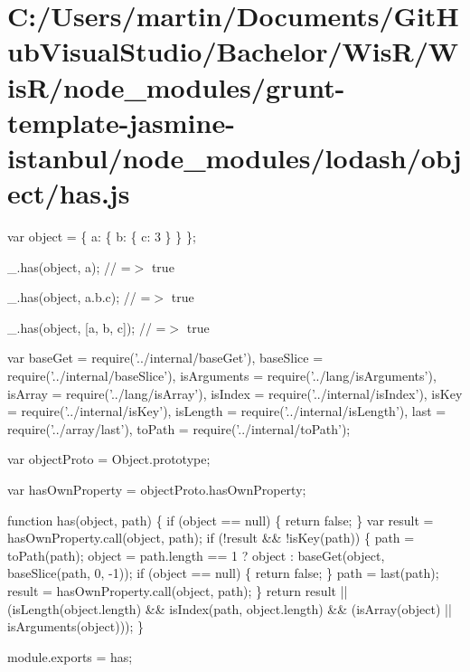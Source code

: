\hypertarget{_c_1_2_users_2martin_2_documents_2_git_hub_visual_studio_2_bachelor_2_wis_r_2_wis_r_2node_modulea712a55f8f1df407f18c03cb57735643}{}\section{C\+:/\+Users/martin/\+Documents/\+Git\+Hub\+Visual\+Studio/\+Bachelor/\+Wis\+R/\+Wis\+R/node\+\_\+modules/grunt-\/template-\/jasmine-\/istanbul/node\+\_\+modules/lodash/object/has.\+js}
var object = \{ \textquotesingle{}a\textquotesingle{}\+: \{ \textquotesingle{}b\textquotesingle{}\+: \{ \textquotesingle{}c\textquotesingle{}\+: 3 \} \} \};

\+\_\+.\+has(object, \textquotesingle{}a\textquotesingle{}); // =$>$ true

\+\_\+.\+has(object, \textquotesingle{}a.\+b.\+c\textquotesingle{}); // =$>$ true

\+\_\+.\+has(object, \mbox{[}\textquotesingle{}a\textquotesingle{}, \textquotesingle{}b\textquotesingle{}, \textquotesingle{}c\textquotesingle{}\mbox{]}); // =$>$ true


\begin{DoxyCodeInclude}
var baseGet = require(\textcolor{stringliteral}{'../internal/baseGet'}),
    baseSlice = require(\textcolor{stringliteral}{'../internal/baseSlice'}),
    isArguments = require(\textcolor{stringliteral}{'../lang/isArguments'}),
    isArray = require(\textcolor{stringliteral}{'../lang/isArray'}),
    isIndex = require(\textcolor{stringliteral}{'../internal/isIndex'}),
    isKey = require(\textcolor{stringliteral}{'../internal/isKey'}),
    isLength = require(\textcolor{stringliteral}{'../internal/isLength'}),
    last = require(\textcolor{stringliteral}{'../array/last'}),
    toPath = require(\textcolor{stringliteral}{'../internal/toPath'});

var objectProto = Object.prototype;

var hasOwnProperty = objectProto.hasOwnProperty;

\textcolor{keyword}{function} has(\textcolor{keywordtype}{object}, path) \{
  \textcolor{keywordflow}{if} (\textcolor{keywordtype}{object} == null) \{
    \textcolor{keywordflow}{return} \textcolor{keyword}{false};
  \}
  var result = hasOwnProperty.call(\textcolor{keywordtype}{object}, path);
  \textcolor{keywordflow}{if} (!result && !isKey(path)) \{
    path = toPath(path);
    \textcolor{keywordtype}{object} = path.length == 1 ? \textcolor{keywordtype}{object} : baseGet(\textcolor{keywordtype}{object}, baseSlice(path, 0, -1));
    \textcolor{keywordflow}{if} (\textcolor{keywordtype}{object} == null) \{
      \textcolor{keywordflow}{return} \textcolor{keyword}{false};
    \}
    path = last(path);
    result = hasOwnProperty.call(\textcolor{keywordtype}{object}, path);
  \}
  \textcolor{keywordflow}{return} result || (isLength(\textcolor{keywordtype}{object}.length) && isIndex(path, \textcolor{keywordtype}{object}.length) &&
    (isArray(\textcolor{keywordtype}{object}) || isArguments(\textcolor{keywordtype}{object})));
\}

module.exports = has;
\end{DoxyCodeInclude}
 